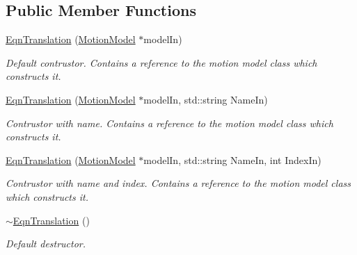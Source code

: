 \subsection*{Public Member Functions}
\begin{DoxyCompactItemize}
\item 
\hyperlink{classosea_1_1ofreq_1_1_eqn_translation_afa65eb0f7d46e25938a73a7a9551784b}{Eqn\-Translation} (\hyperlink{classosea_1_1ofreq_1_1_motion_model}{Motion\-Model} $\ast$model\-In)
\begin{DoxyCompactList}\small\item\em Default contrustor. Contains a reference to the motion model class which constructs it. \end{DoxyCompactList}\item 
\hyperlink{classosea_1_1ofreq_1_1_eqn_translation_ac4a2602609edc1b3ca19b86940880ee5}{Eqn\-Translation} (\hyperlink{classosea_1_1ofreq_1_1_motion_model}{Motion\-Model} $\ast$model\-In, std\-::string Name\-In)
\begin{DoxyCompactList}\small\item\em Contrustor with name. Contains a reference to the motion model class which constructs it. \end{DoxyCompactList}\item 
\hyperlink{classosea_1_1ofreq_1_1_eqn_translation_ab6f7dccce7f207cf6fb0f506772f053a}{Eqn\-Translation} (\hyperlink{classosea_1_1ofreq_1_1_motion_model}{Motion\-Model} $\ast$model\-In, std\-::string Name\-In, int Index\-In)
\begin{DoxyCompactList}\small\item\em Contrustor with name and index. Contains a reference to the motion model class which constructs it. \end{DoxyCompactList}\item 
\hyperlink{classosea_1_1ofreq_1_1_eqn_translation_a877b27d79911a4a5cb1d905221178cc6}{$\sim$\-Eqn\-Translation} ()
\begin{DoxyCompactList}\small\item\em Default destructor. \end{DoxyCompactList}\end{DoxyCompactItemize}
